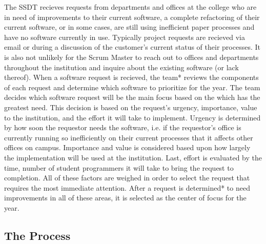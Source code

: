 The SSDT recieves requests from departments and offices at the college who are in need of improvements to their current software, a complete refactoring of their current software, or in some cases, are still using inefficient paper processes and have no software currently in use. Typically project requests are recieved via email or during a discussion of the customer's current status of their processes. It is also not unlikely for the Scrum Master to reach out to offices and departments throughout the institution and inquire about the existing software (or lack thereof).  When a software request is recieved, the team* reviews the components of each request and determine which software to prioritize for the year. The team decides which software request will be the main focus based on the which has the greatest need. This decision is based on the request's urgency, importance, value to the institution, and the effort it will take to implement. Urgency is determined by how soon the requestor needs the software, i.e. if the requestor's office is currently running so inefficiently on their current processes that it affects other offices on campus. Importance and value is considered based upon how largely the implementation will be used at the institution. Last, effort is evaluated by the time, number of student programmers it will take to bring the request to completion. All of these factors are weighed in order to select the request that requires the most immediate attention. After a request is determined* to need improvements in all of these areas, it is selected as the center of focus for the year.

\subsection{The Process}

